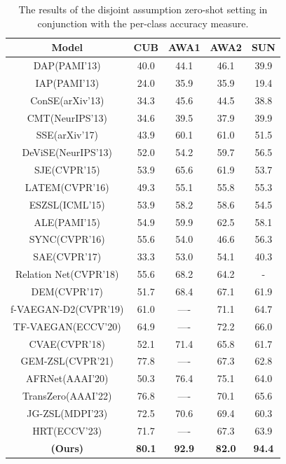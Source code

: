 \documentclass{article}
\begin{document}
\begin{table}[h]
  \footnotesize
  \caption{The results of the disjoint assumption zero-shot setting in conjunction with the per-class accuracy measure.}
  \begin{center}
  \label{tab:example11}
  \begin{tabular}{|c|cccc|}
    \hline
\textbf{Model}	& \textbf{CUB}	 & \textbf{AWA1} & \textbf{AWA2}   & \textbf{SUN}\\
    \hline
DAP(PAMI'13) \cite{b17}		& 40.0			 	& 44.1	& 46.1& 39.9\\
IAP(PAMI'13) \cite{b17}			& 24.0			& 35.9	& 35.9 & 19.4\\
ConSE(arXiv'13) \cite{b22}		& 34.3		& 45.6	& 44.5&38.8\\
CMT(NeurIPS'13) \cite{b23}		& 34.6			& 39.5	& 37.9 & 39.9\\
SSE(arXiv'17) \cite{b65}		& 43.9		& 60.1	& 61.0 & 51.5\\
DeViSE(NeurIPS'13) \cite{b24}		& 52.0		& 54.2	& 59.7 & 56.5\\
SJE(CVPR'15) \cite{b25}		& 53.9		& 65.6	& 61.9 & 53.7\\
LATEM(CVPR'16) \cite{b26}		& 49.3		& 55.1	& 55.8 &55.3\\
ESZSL(ICML'15) \cite{b27}		& 53.9& 58.2	& 58.6 &54.5\\
ALE(PAMI'15)\cite{b1}		& 54.9		& 59.9	& 62.5 & 58.1\\
SYNC(CVPR'16) \cite{b3}		& 55.6	& 54.0	& 46.6 & 56.3\\
SAE(CVPR'17)\cite{b10}		& 33.3	& 53.0	& 54.1 & 40.3\\
Relation Net(CVPR'18)\cite{b32}		& 55.6	& 68.2	& 64.2 & -\\
DEM(CVPR'17)\cite{b28}		& 51.7		& 68.4	& 67.1& 61.9\\
f-VAEGAN-D2(CVPR'19)\cite{b46}		& 61.0	 & ----	& 71.1& 64.7\\
TF-VAEGAN(ECCV'20)\cite{b47}		& 64.9		& ---- 	& 72.2 & 66.0\\
CVAE(CVPR'18)\cite{b35}		& 52.1		 & 71.4	& 65.8& 61.7\\
GEM-ZSL(CVPR'21)\cite{b66} & 77.8		 & ----	& 67.3 & 62.8\\
AFRNet(AAAI'20)\cite{b67}& 50.3		 & 76.4	& 75.1 & 64.0\\
TransZero(AAAI'22)\cite{b77}& 76.8		 & ----	& 70.1 & 65.6\\
JG-ZSL(MDPI'23)\cite{b78}& 72.5		 & 70.6	& 69.4 & 60.3\\
HRT(ECCV'23)\cite{b79}& 71.7		 & ----	& 67.3 & 63.9\\
\hline
\textbf{ (Ours) }		& \textbf{80.1}		 & \textbf{92.9}  	& \textbf{82.0} & \textbf{94.4}\\
\hline
  \end{tabular}
  \end{center}
\end{table}
\end{document}

